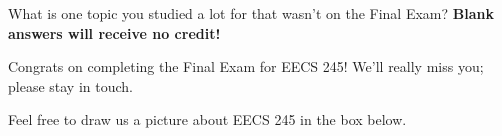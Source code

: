 \documentclass[11pt]{article}
\begin{document}
\newpage

\begin{prob}[(4 pts)]
What is one topic you studied a lot for that wasn't on the Final Exam? \textbf{Blank answers will receive no credit!}

\emptybox{4cm}
\begin{solution}
\end{solution}
\end{prob}

Congrats on completing the Final Exam for EECS 245! We'll really miss you; please stay in touch.

Feel free to draw us a picture about EECS 245 in the box below. 

\emptybox{12cm}
    
\end{document}
